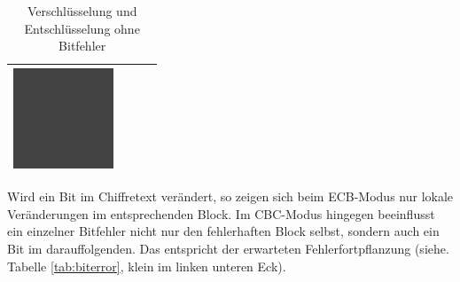 \begin{table}
\begin{center}
\begin{tabular}{|c|c|c|c|}
        \includegraphics[width=3cm]{img/no_error/output_CBC_decrypt} \\
        \hline
        \end{tabular}   
    \end{center}
    \caption{Verschlüsselung und Entschlüsselung ohne Bitfehler}
\end{table}
Wird ein Bit im Chiffretext verändert, so zeigen sich beim ECB-Modus nur lokale Veränderungen im entsprechenden Block. Im CBC-Modus hingegen beeinflusst ein einzelner Bitfehler nicht nur den fehlerhaften Block selbst, 
sondern auch ein Bit im darauffolgenden. Das entspricht der erwarteten 
Fehlerfortpflanzung (siehe. Tabelle \ref{tab:biterror}, klein im linken unteren Eck).
